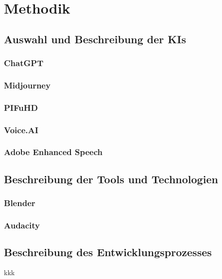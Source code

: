 \chapter{Methodik}

\section{Auswahl und Beschreibung der KIs}
\subsection{ChatGPT}
\subsection{Midjourney}
\subsection{PIFuHD}
\subsection{Voice.AI}
\subsection{Adobe Enhanced Speech}

\section{Beschreibung der Tools und Technologien}
\subsection{Blender}
\subsection{Audacity}
\section{Beschreibung des Entwicklungsprozesses}
kkk